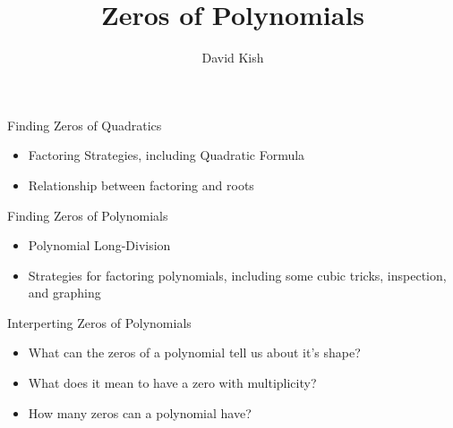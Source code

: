 \documentclass{ximera}
\author{David Kish}
\title{Zeros of Polynomials}
\begin{document}
\begin{abstract}
\end{abstract}
\maketitle


\begin{objectives}

\item Finding Zeros of Quadratics
\begin{itemize}
	\item Factoring Strategies, including Quadratic Formula 
	\item Relationship between factoring and roots 
\end{itemize}

\item Finding Zeros of Polynomials
\begin{itemize}
	\item Polynomial Long-Division 
	\item Strategies for factoring polynomials, including some cubic tricks, inspection, and graphing
\end{itemize}

\item Interperting Zeros of Polynomials
\begin{itemize}
	\item What can the zeros of a polynomial tell us about it's shape?
	\item What does it mean to have a zero with multiplicity?
	\item How many zeros can a polynomial have?
\end{itemize}

\end{objectives}
\end{document}
